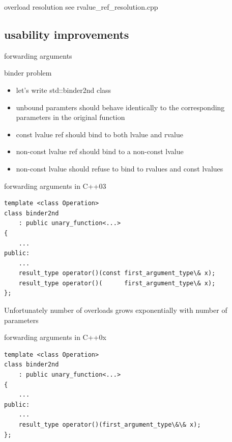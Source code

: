 \documentclass{beamer}
\begin{document}
\begin{frame}{overload resolution}
  see rvalue\_ref\_resolution.cpp
\end{frame}

\subsection{usability improvements}
\begin{frame}{forwarding arguments}
  \begin{block}{binder problem}
    \begin{itemize}
    \item let's write std::binder2nd class
    \item unbound paramters should behave identically to the corresponding parameters in the original function
    \item const lvalue ref should bind to both lvalue and rvalue
    \item non-const lvalue ref should bind to a non-const lvalue
    \item non-const lvalue should refuse to bind to rvalues and const lvalues
    \end{itemize}
  \end{block}
\end{frame}

\begin{frame}{forwarding arguments in C++03}
\begin{verbatim}
template <class Operation>
class binder2nd
    : public unary_function<...>
{
    ...
public:
    ...
    result_type operator()(const first_argument_type\& x);
    result_type operator()(      first_argument_type\& x);
};

\end{verbatim}
\begin{block}{}
  Unfortunately number of overloads grows exponentially with number of
  parameters
\end{block}
\end{frame}

\begin{frame}{forwarding arguments in C++0x}
  \begin{block}{}
\begin{verbatim}
template <class Operation>
class binder2nd
    : public unary_function<...>
{
    ...
public:
    ...
    result_type operator()(first_argument_type\&\& x);
};

\end{verbatim}
  \end{block}
\end{frame}
\end{document}
